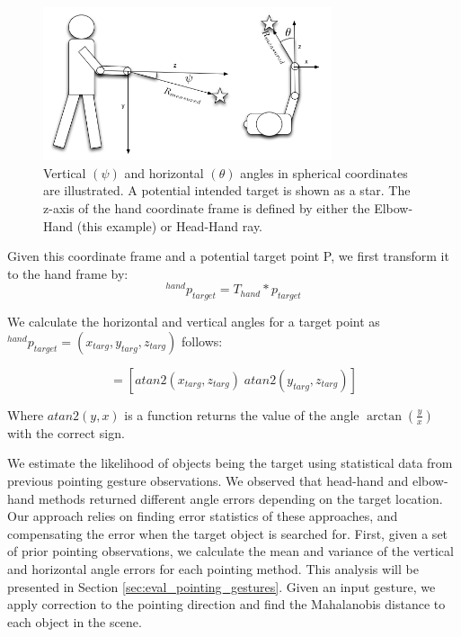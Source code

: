 \documentclass[3p]{elsarticle}
\begin{document}
\begin{figure}[h!]
\centering
\includegraphics[width=85mm]{pics/person_angles_combined_2.png}
\caption{Vertical $(\psi)$ and horizontal $(\theta)$ angles in spherical coordinates are illustrated. A potential intended target is shown as a star. The z-axis of the hand coordinate frame is defined by either the Elbow-Hand (this example) or Head-Hand ray.}
\label{fig:angle_errors}
\end{figure}

Given this coordinate frame and a potential target point P, we first transform it to the hand frame by:
\begin{equation}
^{hand}p_{target} = T_{hand} * p_{target}
\end{equation}

We calculate the horizontal and vertical angles for a target point as $^{hand}p_{target} = (x_{targ}, y_{targ}, z_{targ})$ follows:

\begin{equation}
[\theta_{target}\;\psi_{target}]=[atan2(x_{targ}, z_{targ})\;atan2(y_{targ}, z_{targ})]
\end{equation}

Where $atan2(y,x)$ is a function returns the value of the angle $\arctan(\frac{y}{x})$ with the correct sign.

We estimate the likelihood of objects being the target using statistical data from previous pointing gesture observations. We observed that head-hand and elbow-hand methods returned different angle errors depending on the target location. Our approach relies on finding error statistics of these approaches, and compensating the error when the target object is searched for. First, given a set of prior pointing observations, we calculate the mean and variance of the vertical and horizontal angle errors for each pointing method. This analysis will be presented in Section \ref{sec:eval_pointing_gestures}. Given an input gesture, we apply correction to the pointing direction and find the Mahalanobis distance to each object in the scene.
\end{document}
